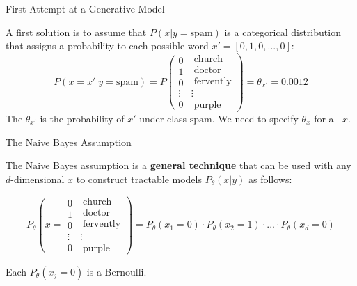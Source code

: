 \documentclass[../../generative_classifiers.tex]{subfiles}
\begin{document}
\begin{frame}[fragile]{First Attempt at a Generative Model}

A first solution is to assume that $P(x|y=\text{spam})$ is a categorical distribution that assigns a probability to each possible word $x'=[0,1,0,...,0]$:
$$
P(x=x'|y=\text{spam}) = P \left( 
\begin{array}{c}
0 \\
1 \\
0 \\
\vdots \\
0 
\end{array}
\right.
\left.
\begin{array}{l}
\;\text{church} \\
\;\text{doctor} \\
\;\text{fervently} \\
\vdots \\
\;\text{purple}
\end{array}
\right) = \theta_{x'} = 0.0012
$$
The $\theta_{x'}$ is the probability of $x'$ under class $\text{spam}$. 
We need to specify $\theta_{x}$ for all $x$.


\end{frame}

\begin{frame}[fragile]{The Naive Bayes Assumption }

The Naive Bayes assumption is a \textbf{general technique} that can be used with any $d$-dimensional $x$ to construct tractable models $P_\theta(x|y)$ as follows:

$$
 P_{\theta} \left( x=
\begin{array}{c}
0 \\
1 \\
0 \\
\vdots \\
0 
\end{array}
\right.
\left.
\begin{array}{l}
\;\text{church} \\
\;\text{doctor} \\
\;\text{fervently} \\
\vdots \\
\;\text{purple}
\end{array}
\right) = P_\theta(x_1=0) \cdot P_\theta(x_2=1) \cdot ... \cdot P_\theta(x_d=0)
$$

Each $P_\theta(x_j=0)$ is a Bernoulli. 

\end{frame}
\end{document}
